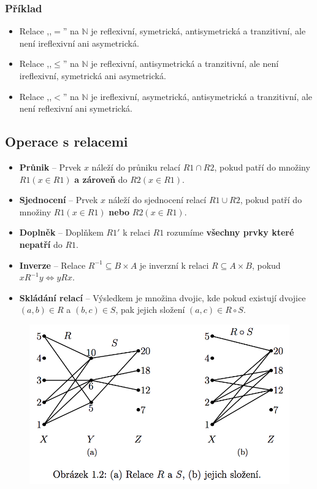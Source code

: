 \subsubsection*{Příklad}
\begin{itemize}
\item Relace ,,$=$'' na $ \mathbb{N} $ je reflexivní, symetrická, antisymetrická a tranzitivní, ale není ireflexivní ani asymetrická.
\item Relace ,,$\leq$'' na $ \mathbb{N} $ je reflexivní, antisymetrická a tranzitivní, ale není ireflexivní, symetrická ani asymetrická.
\item Relace ,,$<$'' na $ \mathbb{N} $ je ireflexivní, asymetrická, antisymetrická a tranzitivní, ale není reflexivní ani symetrická.
\end{itemize}

\subsection{Operace s relacemi}
\begin{itemize}
\item \textbf{Průnik} -- Prvek $ x $ náleží do průniku relací $ R1 \cap R2 $, pokud patří do množiny $ R1 (x \in R1) $ \textbf{a zároveň} do $ R2 (x \in R1)$.
\item \textbf{Sjednocení} -- Prvek $ x $ náleží do sjednocení relací $ R1 \cup R2 $, pokud patří do množiny $ R1 (x \in R1) $ \textbf{nebo} $ R2 (x \in R1)$.
\item \textbf{Doplněk} -- Doplňkem $ R1' $ k relaci $ R1 $ rozumíme \textbf{všechny prvky které nepatří} do $ R1 $.
\item \textbf{Inverze} -- Relace $ R^{-1} \subseteq B \times A $ je inverzní k relaci $ R \subseteq A \times B $, pokud $ xR^{-1}y \Leftrightarrow yRx $.
\item \textbf{Skládání relací} -- Výsledkem je množina dvojic, kde pokud existují dvojice $(a, b)\in R$ a $(b, c)\in S$, pak jejich složení $(a, c) \in R \circ S$.
\end{itemize}

\begin{figure}[H]
	\centering
	\includegraphics[width=.6\textwidth]{assets/relace_skladani}
\end{figure}

